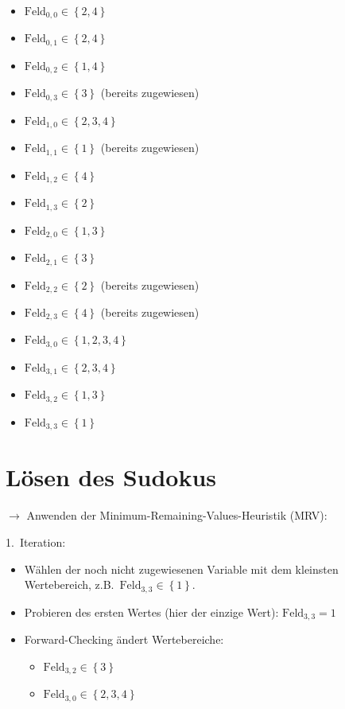 \documentclass[a4paper,draft=false,oneside,12pt,ngerman]{scrreprt}
\begin{document}
\begin{itemize}
    \item $ \text{Feld}_{0,0} \in \left\{ 2, 4 \right\} $
    \item $ \text{Feld}_{0,1} \in \left\{ 2, 4 \right\} $
    \item $ \text{Feld}_{0,2} \in \left\{ 1, 4 \right\} $
    \item $ \text{Feld}_{0,3} \in \left\{ 3 \right\} $ (bereits zugewiesen)
    \item $ \text{Feld}_{1,0} \in \left\{ 2, 3, 4 \right\} $
    \item $ \text{Feld}_{1,1} \in \left\{ 1 \right\} $ (bereits zugewiesen)
    \item $ \text{Feld}_{1,2} \in \left\{ 4 \right\} $
    \item $ \text{Feld}_{1,3} \in \left\{ 2 \right\} $
    \item $ \text{Feld}_{2,0} \in \left\{ 1, 3 \right\} $
    \item $ \text{Feld}_{2,1} \in \left\{ 3 \right\} $
    \item $ \text{Feld}_{2,2} \in \left\{ 2 \right\} $ (bereits zugewiesen)
    \item $ \text{Feld}_{2,3} \in \left\{ 4 \right\} $ (bereits zugewiesen)
    \item $ \text{Feld}_{3,0} \in \left\{ 1, 2, 3, 4 \right\} $
    \item $ \text{Feld}_{3,1} \in \left\{ 2, 3, 4 \right\} $
    \item $ \text{Feld}_{3,2} \in \left\{ 1, 3 \right\} $
    \item $ \text{Feld}_{3,3} \in \left\{ 1 \right\} $
\end{itemize}

\section{Lösen des Sudokus}
\label{sec:loesen_des_sudokus}

$\rightarrow$ Anwenden der Minimum-Remaining-Values-Heuristik (MRV):

1.\ Iteration:

\begin{itemize}
    \item Wählen der noch nicht zugewiesenen Variable mit dem kleinsten
        Wertebereich, z.B.\ $ \text{Feld}_{3,3} \in \left\{ 1 \right\} $.
    \item Probieren des ersten Wertes (hier der einzige Wert): $
        \text{Feld}_{3,3} = 1 $
    \item Forward-Checking ändert Wertebereiche:
        \begin{itemize}
            \item $ \text{Feld}_{3,2} \in \left\{ 3 \right\} $
            \item $ \text{Feld}_{3,0} \in \left\{ 2, 3, 4 \right\} $
        \end{itemize}
\end{itemize}
\end{document}
